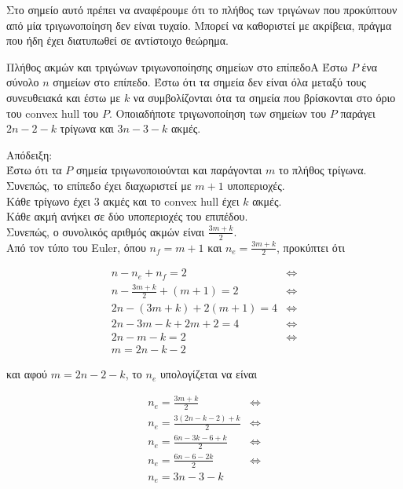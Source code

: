 \documentclass[oneside,12pt]{book}
\theoremstyle{definition}
\begin{document}
Στο σημείο αυτό πρέπει να αναφέρουμε ότι το πλήθος των τριγώνων που προκύπτουν από μία τριγωνοποίηση δεν είναι τυχαίο. Μπορεί να καθοριστεί με ακρίβεια, πράγμα που ήδη έχει διατυπωθεί σε αντίστοιχο θεώρημα. \\

\begin{mytheorem}{Πλήθος ακμών και τριγώνων τριγωνοποίησης σημείων στο επίπεδο}{Α}
	Έστω \(P\) ένα σύνολο \(n\) σημείων στο επίπεδο. Έστω ότι τα σημεία δεν είναι όλα μεταξύ τους συνευθειακά και έστω με \(k\) να συμβολίζονται ότα τα σημεία που βρίσκονται στο όριο του convex hull του \(P\). Οποιαδήποτε τριγωνοποίηση των σημείων του \(P\) παράγει \(2n - 2 - k \) τρίγωνα και \(3n - 3 - k\) ακμές.
\end{mytheorem}

Απόδειξη: \\
Έστω ότι τα \(P\) σημεία τριγωνοποιούνται και παράγονται \(m\) το πλήθος τρίγωνα. Συνεπώς, το επίπεδο έχει διαχωριστεί με \(m + 1\) υποπεριοχές. \\
Κάθε τρίγωνο έχει 3 ακμές και το convex hull έχει \(k\) ακμές. \\
Κάθε ακμή ανήκει σε δύο υποπεριοχές του επιπέδου. \\
Συνεπώς, ο συνολικός αριθμός ακμών είναι  \(\frac{3m + k}{2}\). \\
Από τον τύπο του Euler, όπου \(n_f = m + 1\) και \(n_e = \frac{3m + k}{2}\), προκύπτει ότι 

\begin{align*}
	n - n_e + n_f= 2 & \Leftrightarrow \\
	n - \frac{3m + k}{2} + (m+1) = 2 & \Leftrightarrow \\	
	2n - (3m + k) + 2(m+1) = 4 & \Leftrightarrow \\
	2n - 3m - k + 2m + 2 = 4 & \Leftrightarrow \\
	2n - m - k = 2 & \Leftrightarrow \\
	m = 2n - k - 2
\end{align*}

και αφού \(m = 2n - 2 - k\), το \(n_e\) υπολογίζεται να είναι

\begin{align*}
	n_e = \frac{3m + k}{2} & \Leftrightarrow \\
	n_e = \frac{3(2n - k - 2) + k}{2} & \Leftrightarrow \\
	n_e = \frac{6n - 3k - 6 + k}{2} & \Leftrightarrow \\
	n_e = \frac{6n - 6 - 2k}{2} & \Leftrightarrow \\
	n_e = 3n - 3 - k
\end{align*}
\end{document}
